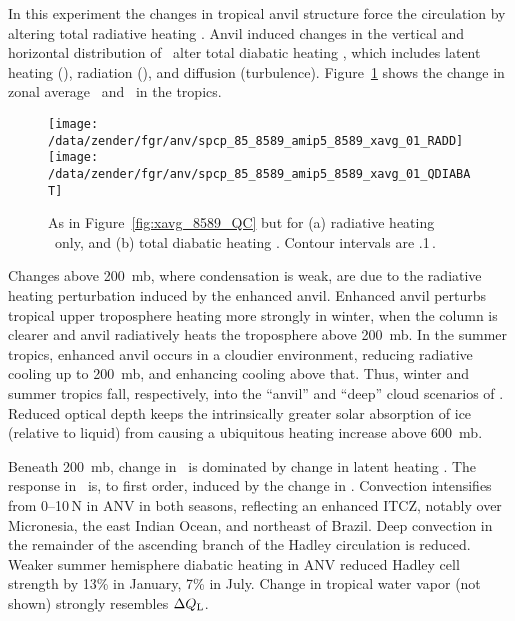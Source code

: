 \documentclass[twoside,agupp]{aguplus}
\begin{document}
In this experiment the changes in tropical anvil structure 
force the circulation by altering total radiative heating \QR.
Anvil induced changes in the vertical and horizontal distribution of
\QR\ alter total diabatic heating \QT, which includes latent heating
(\QL), radiation (\QR), and diffusion (turbulence).
Figure~\ref{fig:xavg_8589_QDIABAT} shows the change in zonal average
\QR\ and \QT\ in the tropics. 
\begin{figure}
\begin{center}
\texttt{[image: /data/zender/fgr/anv/spcp\_85\_8589\_amip5\_8589\_xavg\_01\_RADD]}\vfill
\texttt{[image: /data/zender/fgr/anv/spcp\_85\_8589\_amip5\_8589\_xavg\_01\_QDIABAT]}\vfill
\end{center}
\caption{
As in Figure~\ref{fig:xavg_8589_QC} but for (a) radiative heating \QR\
only, and (b) total diabatic heating \QT.
Contour intervals are .1\,\kxday.   
\label{fig:xavg_8589_QDIABAT}}   
\end{figure}
Changes above 200~mb, where condensation is weak, are due to the
radiative heating perturbation induced by the enhanced anvil.
Enhanced anvil perturbs tropical upper troposphere heating more
strongly in winter, when the column is clearer and anvil radiatively
heats the troposphere above 200~mb.  
In the summer tropics, enhanced anvil occurs in a cloudier 
environment, reducing radiative cooling up to 200~mb, and enhancing
cooling above that. 
Thus, winter and summer tropics fall, respectively, into the ``anvil''
and ``deep'' cloud scenarios of \cite{RaR891}.
Reduced optical depth keeps the intrinsically greater solar absorption
of ice (relative to liquid) from causing a ubiquitous heating increase
above 600~mb.

Beneath 200~mb, change in \QT\ is dominated by change in latent
heating \QL. 
The response in \QL\ is, to first order, induced by the change in
\QR. 
Convection intensifies from 0--10\,\dgr N in ANV in both seasons,
reflecting an enhanced ITCZ, notably over Micronesia, the east
Indian Ocean, and northeast of Brazil. 
Deep convection in the remainder of the ascending branch of the Hadley
circulation is reduced. 
Weaker summer hemisphere diabatic heating in ANV reduced Hadley cell
strength by 13\% in January, 7\% in July.
Change in tropical water vapor (not shown) strongly resembles $\Delta
\mbox{$Q_\mathrm{L}$}$.
\end{document}
